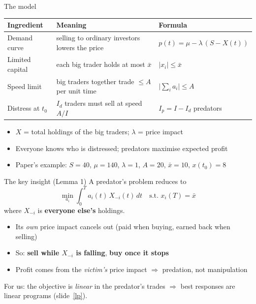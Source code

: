 \documentclass[aspectratio=169,11pt]{beamer}
\newcommand{\hl}[1]{\textbf{\color{prey}#1}}
\begin{document}
\begin{frame}{The model}
  \small
  \begin{tabular}{@{}p{}p{}l@{}}
    \toprule
    Ingredient & Meaning & Formula \\
    \midrule
    Demand curve & selling to ordinary investors lowers the price & $p(t) = \mu - \lambda\,(S - X(t))$ \\
    Limited capital & each big trader holds at most $\bar x$ & $|x_i| \le \bar x$ \\
    Speed limit & big traders together trade $\le A$ per unit time & $\bigl|\sum_i a_i\bigr| \le A$ \\
    Distress at $t_0$ & $I_d$ traders must sell at speed $A/I$ & $I_p = I - I_d$ predators \\
    \bottomrule
  \end{tabular}

  \normalsize
  \vspace{1em}
  \begin{itemize}
    \item $X$ = total holdings of the big traders; $\lambda$ = price impact
    \item Everyone knows who is distressed; predators maximise expected profit
    \item Paper's example: $S = 40$, $\mu = 140$, $\lambda = 1$, $A = 20$, $\bar x = 10$, $x(t_0) = 8$
  \end{itemize}
\end{frame}

\begin{frame}{The key insight (Lemma 1)}
  A predator's problem reduces to
  \[
    \min_{a_i} \int_0^T a_i(t)\, X_{-i}(t)\, dt
    \quad\text{s.t. } x_i(T) = \bar x
  \]
  where $X_{-i}$ is \hl{everyone else's} holdings.

  \vspace{0.8em}
  \begin{itemize}
    \item Its \emph{own} price impact cancels out (paid when buying, earned back when selling)
    \item So: \hl{sell while $X_{-i}$ is falling}, \hl{buy once it stops}
    \item Profit comes from the \emph{victim's} price impact $\Rightarrow$ predation, not manipulation
  \end{itemize}

  \vspace{0.6em}
  \alert{For us:} the objective is \emph{linear} in the predator's trades $\Rightarrow$ best responses
  are linear programs (slide~\ref{lp}).
\end{frame}
\end{document}
